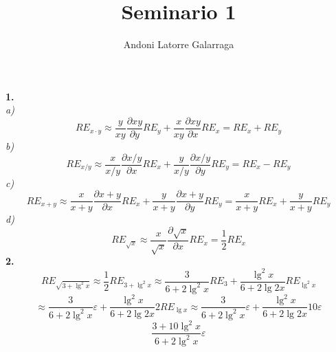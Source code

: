 \documentclass{article}
\title{Seminario 1}
\author{Andoni Latorre Galarraga}
\date{}
\begin{document}
\maketitle

\noindent \textbf{1.}
\\
\textit{a)}
$$
RE_{x \cdot y} \approx \frac{y}{x y} \frac{\partial xy}{\partial y} RE_y + \frac{x}{x y} \frac{\partial xy}{\partial x} RE_x = RE_x + RE_y
$$
\textit{b)}
$$
RE_{x / y} \approx \frac{x}{x/y} \frac{\partial x/y}{\partial x} RE_x + \frac{y}{x/y} \frac{\partial x/y}{\partial y} RE_y = RE_x - RE_y
$$
\textit{c)}
$$
RE_{x + y} \approx \frac{x}{x+y} \frac{\partial x+y}{\partial x} RE_x + \frac{y}{x+y} \frac{\partial x+y}{\partial y} RE_y = \frac{x}{x+y} RE_x + \frac{y}{x+y} RE_y
$$
\textit{d)}
$$
RE_{\sqrt{x}} \approx \frac{x}{\sqrt{x}} \frac{\partial \sqrt{x}}{\partial x} RE_x = \frac{1}{2} RE_x
$$
\textbf{2.}
$$
RE_{\sqrt{3+\lg^2x}} 
\approx
\frac{1}{2} RE_{3+\lg^2x}
\approx
\frac{3}{6+2\lg^2x} RE_3 + \frac{\lg^2x }{6+2\lg2x} RE_{\lg^2x}
$$
$$
\approx
\frac{3}{6+2\lg^2x}  \varepsilon + \frac{\lg^2 x }{6+2\lg2x} 2 RE_{\lg x}
\approx
\frac{3}{6+2\lg^2x}  \varepsilon + \frac{\lg^2x }{6+2\lg2x} 10 \varepsilon
$$
$$
\frac{3+10 \lg^2x}{6+2\lg^2x}\varepsilon
$$
\end{document}
